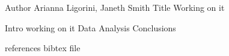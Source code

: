 Author Arianna Ligorini, Janeth Smith 
Title Working on it

Intro working on it
Data
Analysis
Conclusions


references
bibtex file
